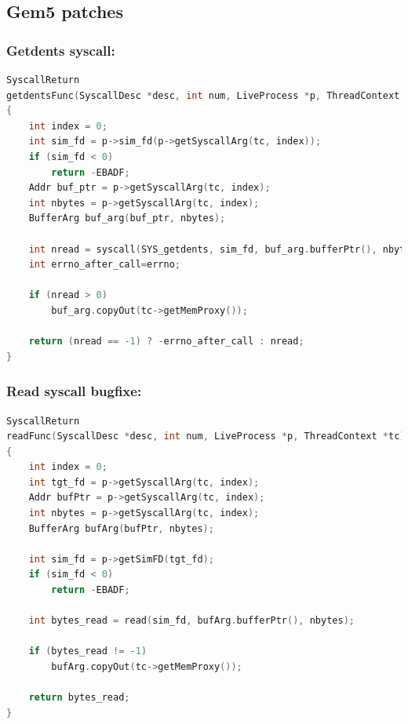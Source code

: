 \documentclass{article}
\begin{document}
\subsection{Gem5 patches}
\subsubsection{Getdents syscall:}
\label{bugfixes_getdents}
\begin{lstlisting}[language=c++]
SyscallReturn
getdentsFunc(SyscallDesc *desc, int num, LiveProcess *p, ThreadContext *tc)
{
    int index = 0;
    int sim_fd = p->sim_fd(p->getSyscallArg(tc, index));
    if (sim_fd < 0)
        return -EBADF;
    Addr buf_ptr = p->getSyscallArg(tc, index);
    int nbytes = p->getSyscallArg(tc, index);
    BufferArg buf_arg(buf_ptr, nbytes);

    int nread = syscall(SYS_getdents, sim_fd, buf_arg.bufferPtr(), nbytes);
    int errno_after_call=errno;

    if (nread > 0)
        buf_arg.copyOut(tc->getMemProxy());

    return (nread == -1) ? -errno_after_call : nread;
}
\end{lstlisting}

\subsubsection{Read syscall bugfixe:}
\label{bugfixes_read}
\begin{lstlisting}[language=c++]
SyscallReturn
readFunc(SyscallDesc *desc, int num, LiveProcess *p, ThreadContext *tc)
{
    int index = 0;
    int tgt_fd = p->getSyscallArg(tc, index);
    Addr bufPtr = p->getSyscallArg(tc, index);
    int nbytes = p->getSyscallArg(tc, index);
    BufferArg bufArg(bufPtr, nbytes);

    int sim_fd = p->getSimFD(tgt_fd);
    if (sim_fd < 0)
        return -EBADF;

    int bytes_read = read(sim_fd, bufArg.bufferPtr(), nbytes);

    if (bytes_read != -1)
        bufArg.copyOut(tc->getMemProxy());

    return bytes_read;
}
\end{lstlisting}
\end{document}
